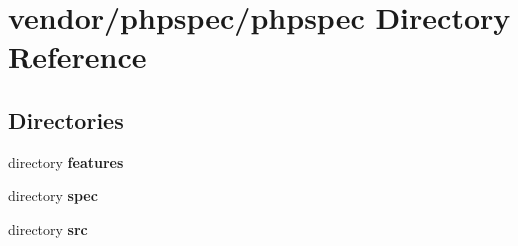 \section{vendor/phpspec/phpspec Directory Reference}
\label{dir_90bf70c801042406be9712ee35fb9fed}
\subsection*{Directories}
\begin{DoxyCompactItemize}
\item 
directory {\bf features}
\item 
directory {\bf spec}
\item 
directory {\bf src}
\end{DoxyCompactItemize}
